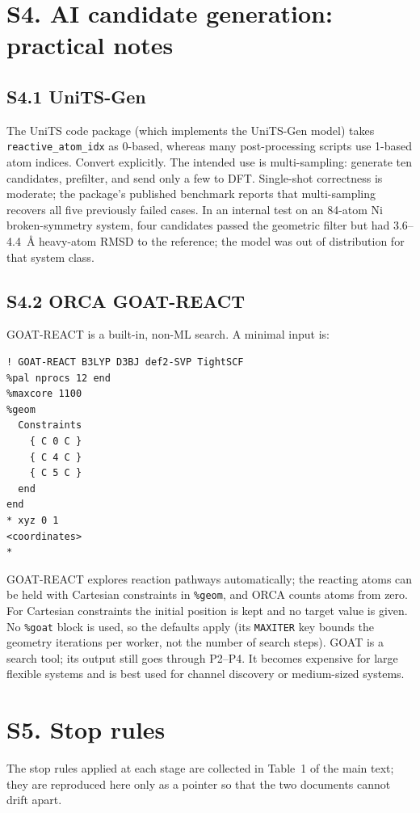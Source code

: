 \documentclass[11pt,a4paper]{article}
\begin{document}
\section*{S4. AI candidate generation: practical notes}

\subsection*{S4.1 UniTS-Gen}
The UniTS code package (which implements the UniTS-Gen model) takes \texttt{reactive\_atom\_idx} as 0-based, whereas many post-processing
scripts use 1-based atom indices. Convert explicitly. The intended use is
multi-sampling: generate ten candidates, prefilter, and send only a few to DFT.
Single-shot correctness is moderate; the package's published benchmark reports that
multi-sampling recovers all five previously failed cases. In an internal test
on an 84-atom Ni broken-symmetry system, four candidates passed the geometric
filter but had 3.6--4.4~\AA{} heavy-atom RMSD to the reference; the model was out
of distribution for that system class.

\subsection*{S4.2 ORCA GOAT-REACT}
GOAT-REACT is a built-in, non-ML search. A minimal input is:
\begin{verbatim}
! GOAT-REACT B3LYP D3BJ def2-SVP TightSCF
%pal nprocs 12 end
%maxcore 1100
%geom
  Constraints
    { C 0 C }
    { C 4 C }
    { C 5 C }
  end
end
* xyz 0 1
<coordinates>
*
\end{verbatim}
GOAT-REACT explores reaction pathways automatically; the reacting atoms can be held with Cartesian constraints in \texttt{\%geom}, and ORCA counts atoms from zero. For Cartesian constraints the initial position is kept and no target value is given. No \texttt{\%goat} block is used, so the defaults apply (its \texttt{MAXITER} key bounds the geometry iterations per worker, not the number of search steps). GOAT is a search tool;
its output still goes through P2--P4. It becomes expensive for large flexible
systems and is best used for channel discovery or medium-sized systems.

\section*{S5. Stop rules}
The stop rules applied at each stage are collected in Table~1 of the main text; they are reproduced here only as a pointer so that the two documents cannot drift apart.
\end{document}
